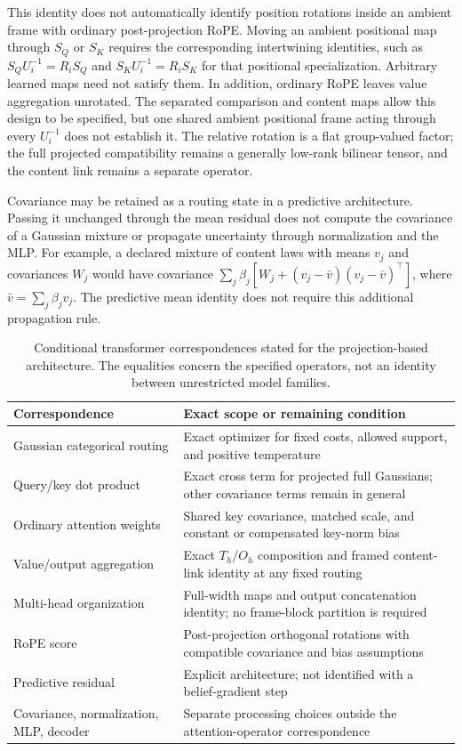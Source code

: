 \documentclass[twoside,11pt]{article}
\begin{document}
This identity does not automatically identify position rotations inside an ambient frame with ordinary post-projection RoPE. Moving an ambient positional map through $S_Q$ or $S_K$ requires the corresponding intertwining identities, such as $S_QU_i^{-1}=R_iS_Q$ and $S_KU_i^{-1}=R_iS_K$ for that positional specialization. Arbitrary learned maps need not satisfy them. In addition, ordinary RoPE leaves value aggregation unrotated. The separated comparison and content maps allow this design to be specified, but one shared ambient positional frame acting through every $U_i^{-1}$ does not establish it. The relative rotation is a flat group-valued factor; the full projected compatibility remains a generally low-rank bilinear tensor, and the content link remains a separate operator.

Covariance may be retained as a routing state in a predictive architecture. Passing it unchanged through the mean residual does not compute the covariance of a Gaussian mixture or propagate uncertainty through normalization and the MLP. For example, a declared mixture of content laws with means $v_j$ and covariances $W_j$ would have covariance $\sum_j\beta_j[W_j+(v_j-\bar v)(v_j-\bar v)^\top]$, where $\bar v=\sum_j\beta_jv_j$. The predictive mean identity does not require this additional propagation rule.

\begin{table}[t]
\centering
\small
\renewcommand{\arraystretch}{1.1}
\begin{tabularx}{\textwidth}{@{}p{}X@{}}
\toprule
Correspondence & Exact scope or remaining condition \\
\midrule
Gaussian categorical routing & Exact optimizer for fixed costs, allowed support, and positive temperature \\
Query/key dot product & Exact cross term for projected full Gaussians; other covariance terms remain in general \\
Ordinary attention weights & Shared key covariance, matched scale, and constant or compensated key-norm bias \\
Value/output aggregation & Exact $T_h/O_h$ composition and framed content-link identity at any fixed routing \\
Multi-head organization & Full-width maps and output concatenation identity; no frame-block partition is required \\
RoPE score & Post-projection orthogonal rotations with compatible covariance and bias assumptions \\
Predictive residual & Explicit architecture; not identified with a belief-gradient step \\
Covariance, normalization, MLP, decoder & Separate processing choices outside the attention-operator correspondence \\
\bottomrule
\end{tabularx}
\caption{Conditional transformer correspondences stated for the projection-based architecture. The equalities concern the specified operators, not an identity between unrestricted model families.}
\label{tab:fep_nn_correspondence}
\end{table}
\end{document}
